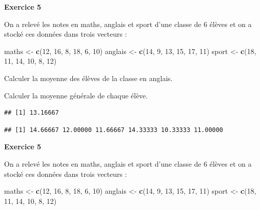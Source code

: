 \documentclass[
  12pt,
]{book}
\newenvironment{Shaded}{\begin{snugshade}}{\end{snugshade}}
\newcommand{\DecValTok}[1]{\textcolor[rgb]{0.00,0.00,0.81}{#1}}
\newcommand{\KeywordTok}[1]{\textcolor[rgb]{0.13,0.29,0.53}{\textbf{#1}}}
\newcommand{\NormalTok}[1]{#1}
\newcommand{\StringTok}[1]{\textcolor[rgb]{0.31,0.60,0.02}{#1}}
\begin{document}
\textbf{Exercice 5}

On a relevé les notes en maths, anglais et sport d'une classe de 6 élèves et on a stocké ces données dans trois vecteurs :

\begin{Shaded}
\begin{Highlighting}[]
\NormalTok{maths <-}\StringTok{ }\KeywordTok{c}\NormalTok{(}\DecValTok{12}\NormalTok{, }\DecValTok{16}\NormalTok{, }\DecValTok{8}\NormalTok{, }\DecValTok{18}\NormalTok{, }\DecValTok{6}\NormalTok{, }\DecValTok{10}\NormalTok{)}
\NormalTok{anglais <-}\StringTok{ }\KeywordTok{c}\NormalTok{(}\DecValTok{14}\NormalTok{, }\DecValTok{9}\NormalTok{, }\DecValTok{13}\NormalTok{, }\DecValTok{15}\NormalTok{, }\DecValTok{17}\NormalTok{, }\DecValTok{11}\NormalTok{)}
\NormalTok{sport <-}\StringTok{ }\KeywordTok{c}\NormalTok{(}\DecValTok{18}\NormalTok{, }\DecValTok{11}\NormalTok{, }\DecValTok{14}\NormalTok{, }\DecValTok{10}\NormalTok{, }\DecValTok{8}\NormalTok{, }\DecValTok{12}\NormalTok{)}
\end{Highlighting}
\end{Shaded}

Calculer la moyenne des élèves de la classe en anglais.

Calculer la moyenne générale de chaque élève.

\begin{verbatim}
## [1] 13.16667
\end{verbatim}

\begin{verbatim}
## [1] 14.66667 12.00000 11.66667 14.33333 10.33333 11.00000
\end{verbatim}

\textbf{Exercice 5}

On a relevé les notes en maths, anglais et sport d'une classe de 6 élèves et on a stocké ces données dans trois vecteurs :

\begin{Shaded}
\begin{Highlighting}[]
\NormalTok{maths <-}\StringTok{ }\KeywordTok{c}\NormalTok{(}\DecValTok{12}\NormalTok{, }\DecValTok{16}\NormalTok{, }\DecValTok{8}\NormalTok{, }\DecValTok{18}\NormalTok{, }\DecValTok{6}\NormalTok{, }\DecValTok{10}\NormalTok{)}
\NormalTok{anglais <-}\StringTok{ }\KeywordTok{c}\NormalTok{(}\DecValTok{14}\NormalTok{, }\DecValTok{9}\NormalTok{, }\DecValTok{13}\NormalTok{, }\DecValTok{15}\NormalTok{, }\DecValTok{17}\NormalTok{, }\DecValTok{11}\NormalTok{)}
\NormalTok{sport <-}\StringTok{ }\KeywordTok{c}\NormalTok{(}\DecValTok{18}\NormalTok{, }\DecValTok{11}\NormalTok{, }\DecValTok{14}\NormalTok{, }\DecValTok{10}\NormalTok{, }\DecValTok{8}\NormalTok{, }\DecValTok{12}\NormalTok{)}
\end{Highlighting}
\end{Shaded}
\end{document}
